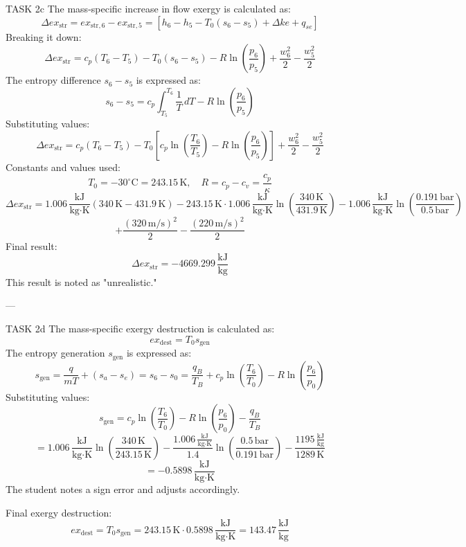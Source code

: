 TASK 2c  
The mass-specific increase in flow exergy is calculated as:  
\[
\Delta ex_{\text{str}} = ex_{\text{str},6} - ex_{\text{str},5} = [h_6 - h_5 - T_0(s_6 - s_5) + \Delta ke + q_{se}]
\]  
Breaking it down:  
\[
\Delta ex_{\text{str}} = c_p(T_6 - T_5) - T_0(s_6 - s_5) - R \ln \left(\frac{p_6}{p_5}\right) + \frac{w_6^2}{2} - \frac{w_5^2}{2}
\]  
The entropy difference \( s_6 - s_5 \) is expressed as:  
\[
s_6 - s_5 = c_p \int_{T_5}^{T_6} \frac{1}{T} \, dT - R \ln \left(\frac{p_6}{p_5}\right)
\]  
Substituting values:  
\[
\Delta ex_{\text{str}} = c_p(T_6 - T_5) - T_0 \left[c_p \ln \left(\frac{T_6}{T_5}\right) - R \ln \left(\frac{p_6}{p_5}\right)\right] + \frac{w_6^2}{2} - \frac{w_5^2}{2}
\]  
Constants and values used:  
\[
T_0 = -30^\circ\text{C} = 243.15 \, \text{K}, \quad R = c_p - c_v = \frac{c_p}{\kappa}
\]  
\[
\Delta ex_{\text{str}} = 1.006 \, \frac{\text{kJ}}{\text{kg·K}} \left(340 \, \text{K} - 431.9 \, \text{K}\right) - 243.15 \, \text{K} \cdot 1.006 \, \frac{\text{kJ}}{\text{kg·K}} \ln \left(\frac{340 \, \text{K}}{431.9 \, \text{K}}\right) - 1.006 \, \frac{\text{kJ}}{\text{kg·K}} \ln \left(\frac{0.191 \, \text{bar}}{0.5 \, \text{bar}}\right)
\]  
\[
+ \frac{(320 \, \text{m/s})^2}{2} - \frac{(220 \, \text{m/s})^2}{2}
\]  
Final result:  
\[
\Delta ex_{\text{str}} = -4669.299 \, \frac{\text{kJ}}{\text{kg}}
\]  
This result is noted as "unrealistic."

---

TASK 2d  
The mass-specific exergy destruction is calculated as:  
\[
ex_{\text{dest}} = T_0 s_{\text{gen}}
\]  
The entropy generation \( s_{\text{gen}} \) is expressed as:  
\[
s_{\text{gen}} = \frac{q}{mT} + (s_a - s_e) = s_6 - s_0 = \frac{q_B}{T_B} + c_p \ln \left(\frac{T_6}{T_0}\right) - R \ln \left(\frac{p_6}{p_0}\right)
\]  
Substituting values:  
\[
s_{\text{gen}} = c_p \ln \left(\frac{T_6}{T_0}\right) - R \ln \left(\frac{p_6}{p_0}\right) - \frac{q_B}{T_B}
\]  
\[
= 1.006 \, \frac{\text{kJ}}{\text{kg·K}} \ln \left(\frac{340 \, \text{K}}{243.15 \, \text{K}}\right) - \frac{1.006 \, \frac{\text{kJ}}{\text{kg·K}}}{1.4} \ln \left(\frac{0.5 \, \text{bar}}{0.191 \, \text{bar}}\right) - \frac{1195 \, \frac{\text{kJ}}{\text{kg}}}{1289 \, \text{K}}
\]  
\[
= -0.5898 \, \frac{\text{kJ}}{\text{kg·K}}
\]  
The student notes a sign error and adjusts accordingly.  

Final exergy destruction:  
\[
ex_{\text{dest}} = T_0 s_{\text{gen}} = 243.15 \, \text{K} \cdot 0.5898 \, \frac{\text{kJ}}{\text{kg·K}} = 143.47 \, \frac{\text{kJ}}{\text{kg}}
\]
